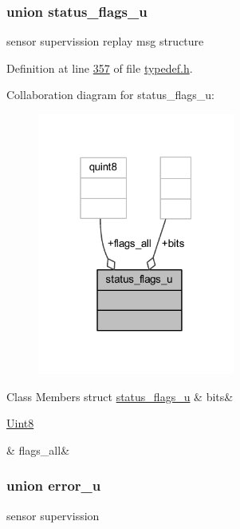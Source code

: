 \subsubsection{union status\+\_\+flags\+\_\+u}
sensor supervission replay msg structure 

Definition at line \hyperlink{a00001_source_l00357}{357} of file \hyperlink{a00001_source}{typedef.\+h}.



Collaboration diagram for status\+\_\+flags\+\_\+u\+:
\nopagebreak
\begin{figure}[H]
\begin{center}
\leavevmode
\includegraphics[width=184pt]{d2/dc8/a00242}
\end{center}
\end{figure}
\begin{DoxyFields}{Class Members}
\hypertarget{a00001_abc5cffc867c4ade8f768061e653eccb8}{struct \hyperlink{a00001_de/d76/a00134}{status\+\_\+flags\+\_\+u}}\label{a00001_abc5cffc867c4ade8f768061e653eccb8}
&
bits&
\\
\hline

\hypertarget{a00001_a2d5067795eb39162534e06fa9f6ac76c}{\hyperlink{a00001_a979e3e23b9a449e69ab6a8a83b6042f8}{Uint8}}\label{a00001_a2d5067795eb39162534e06fa9f6ac76c}
&
flags\+\_\+all&
\\
\hline

\end{DoxyFields}
\label{d4/d31/a00069}
\hypertarget{a00001_d4/d31/a00069}{}
\subsubsection{union error\+\_\+u}
sensor supervission 

